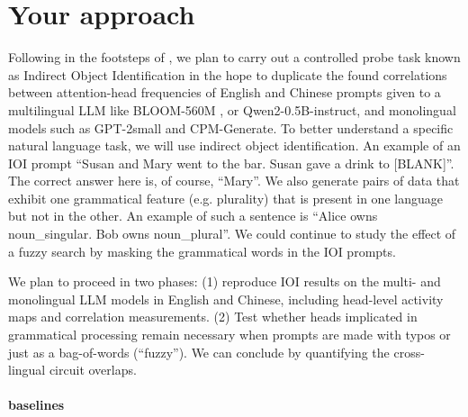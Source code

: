\documentclass[11pt,a4paper]{article}
\newcommand{\blue}{\color{black}{}}
\newcommand{\black}{\color{black}{}}
\newcommand{\mb}{\color{black}{}}
\begin{document}


\section{Your approach}


\blue

Following in the footsteps of \cite{ZYZEP25}, we plan to carry out a controlled probe task known as Indirect Object Identification \cite{WVCSS23} in the hope to duplicate the found correlations between attention-head frequencies of English and Chinese prompts given to a multilingual LLM like BLOOM-560M \cite{BLOOM22}, \mb or Qwen2-0.5B-instruct, and monolingual models such as GPT-2small and CPM-Generate. To better understand a specific natural language task, we will use indirect object identification. An example of an IOI prompt \blue``Susan and Mary went to the bar. Susan gave a drink to [BLANK]''. The correct answer here is, of course, ``Mary''. \mb We also generate pairs of data that exhibit one grammatical feature (e.g. plurality) that is present in one language but not in the other. An example of such a sentence is ``Alice owns noun\_singular. Bob owns noun\_plural''. We could continue to study the effect of a fuzzy search by masking the grammatical words in the IOI prompts.  

\blue
We plan to proceed in two phases: (1) reproduce IOI results on the multi- and monolingual LLM models in English and Chinese, including head-level activity maps and correlation measurements. (2) Test whether heads implicated in grammatical processing remain necessary when prompts are made with typos or just as a bag-of-words (``fuzzy''). We can conclude by quantifying the cross-lingual circuit overlaps. 

\black

\paragraph{baselines}
\end{document}
